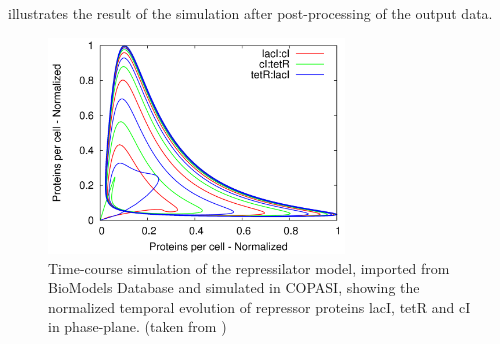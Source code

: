  illustrates the result of the simulation after post-processing of the output data. 
\begin{figure}
\centering
\includegraphics[width=0.7\textwidth]{examples/simEx2.png}
\caption{Time-course simulation of the repressilator model, imported from BioModels Database and simulated in COPASI, showing the normalized temporal evolution of repressor proteins lacI, tetR and cI in phase-plane. (taken from \cite{Waltemath:2011})}
\label{fig:simEx2}
\end{figure}

